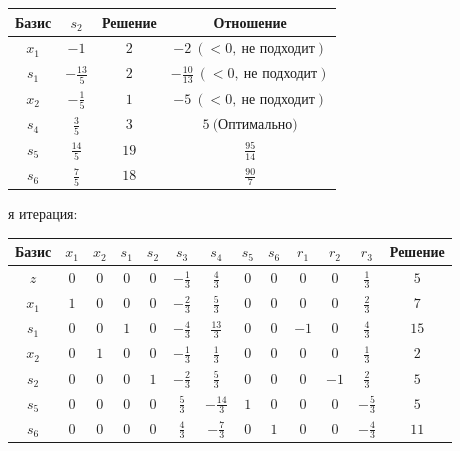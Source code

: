 \documentclass{article}%
\begin{document}
\begin{flushleft}
\newline%
\newline%
\newline%
\begin{tabular}{|cccc|}%
\hline%
Базис&$s_{2}$&Решение&Отношение\\%
\hline%
$x_{1}$&$-1$&$2$&$-2\: (< 0, \: \text{не подходит})$\\%
$s_{1}$&$-\frac{13}{5}$&$2$&$-\frac{10}{13}\: (< 0, \: \text{не подходит})$\\%
$x_{2}$&$-\frac{1}{5}$&$1$&$-5\: (< 0, \: \text{не подходит})$\\%
$s_{4}$&$\frac{3}{5}$&$3$&$5\: \text{(Оптимально)}$\\%
$s_{5}$&$\frac{14}{5}$&$19$&$\frac{95}{14}$\\%
$s_{6}$&$\frac{7}{5}$&$18$&$\frac{90}{7}$\\%
\hline%
\end{tabular}%
\newline%
\newline%
я итерация: %
\newline%
\newline%
\renewcommand{\arraystretch}{1.3}%
\begin{tabular}{|c|ccccccccccc|c|}%
\hline%
Базис&$x_{1}$&$x_{2}$&$s_{1}$&$s_{2}$&$s_{3}$&$s_{4}$&$s_{5}$&$s_{6}$&$r_{1}$&$r_{2}$&$r_{3}$&Решение\\%
\hline%
$z$&$0$&$0$&$0$&$0$&$-\frac{1}{3}$&$\frac{4}{3}$&$0$&$0$&$0$&$0$&$\frac{1}{3}$&$5$\\%
\hline%
$x_{1}$&$1$&$0$&$0$&$0$&$-\frac{2}{3}$&$\frac{5}{3}$&$0$&$0$&$0$&$0$&$\frac{2}{3}$&$7$\\%
$s_{1}$&$0$&$0$&$1$&$0$&$-\frac{4}{3}$&$\frac{13}{3}$&$0$&$0$&$-1$&$0$&$\frac{4}{3}$&$15$\\%
$x_{2}$&$0$&$1$&$0$&$0$&$-\frac{1}{3}$&$\frac{1}{3}$&$0$&$0$&$0$&$0$&$\frac{1}{3}$&$2$\\%
$s_{2}$&$0$&$0$&$0$&$1$&$-\frac{2}{3}$&$\frac{5}{3}$&$0$&$0$&$0$&$-1$&$\frac{2}{3}$&$5$\\%
$s_{5}$&$0$&$0$&$0$&$0$&$\frac{5}{3}$&$-\frac{14}{3}$&$1$&$0$&$0$&$0$&$-\frac{5}{3}$&$5$\\%
$s_{6}$&$0$&$0$&$0$&$0$&$\frac{4}{3}$&$-\frac{7}{3}$&$0$&$1$&$0$&$0$&$-\frac{4}{3}$&$11$\\%
\hline%
\end{tabular}%
\newline%
\newline%
\newline%

\end{flushleft}
\end{document}

